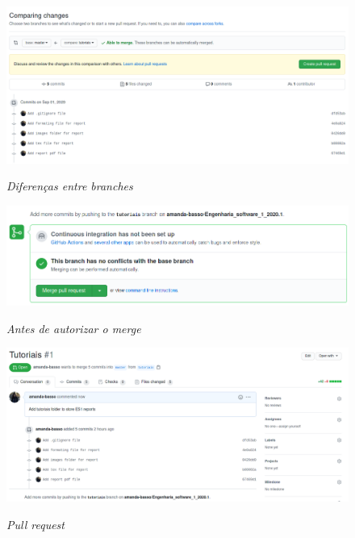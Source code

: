     \begin{figure}[H]
        \caption{\textit{Diferenças entre \textit{branches}}}
        \vspace{0.5cm}
        \centering
        \includegraphics[width=15cm]{imagens/comparing_changes.png}
        \label{figura:comparing_changes}
    \end{figure}

    \begin{figure}[H]
        \caption{\textit{Antes de autorizar o \textit{merge}}}
        \vspace{0.5cm}
        \centering
        \includegraphics[width=15cm]{imagens/merge.png}
        \label{figura:merge}
    \end{figure}

    \begin{figure}[H]
        \caption{\textit{Pull request}}
        \vspace{0.5cm}
        \centering
        \includegraphics[width=15cm]{imagens/pull_request.png}
        \label{figura:pull_request}
    \end{figure}
